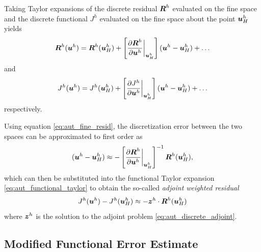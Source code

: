 Taking Taylor expansions of the discrete residual $\boldsymbol{R}^h$ evaluated on the
fine space and the discrete functional $J^h$ evaluated on the fine space
about the point $\boldsymbol{u}^h_H$ yields
%
\begin{gather}
\boldsymbol{R}^h(\boldsymbol{u}^h) = \boldsymbol{R}^h(\boldsymbol{u}^h_H) +
\left[ 
\frac{ \partial \boldsymbol{R}^h }{ \partial \boldsymbol{u}^h} \biggr|_{\boldsymbol{u}^h_H}
\right]
(\boldsymbol{u}^h - \boldsymbol{u}^h_H) + \dots
\label{eq:aut_residual_taylor}
\end{gather}
%
and
%
%
\begin{gather}
J^h(\boldsymbol{u}^h) = J^h(\boldsymbol{u}^h_H) +
\left[
\frac{ \partial J^h } { \partial \boldsymbol{u}^h} \biggr|_{\boldsymbol{u}^h_H}
\right]
(\boldsymbol{u}^h - \boldsymbol{u}^h_H) + \dots
\label{eq:aut_functional_taylor}
\end{gather}
%
respectively.

Using equation \eqref{eq:aut_fine_resid}, the discretization error
between the two spaces can be approximated to first order as
%
\begin{gather}
(\boldsymbol{u}^h - \boldsymbol{u}^h_H) \approx
- \left[
\frac{ \partial \boldsymbol{R}^h } { \partial \boldsymbol{u}^h } \biggr|_{\boldsymbol{u}^h_H}
\right]^{-1}
\boldsymbol{R}^h (\boldsymbol{u}^h_H ),
\label{eq:aut_disc_error_approx}
\end{gather}
%
which can then be substituted into the functional Taylor expansion
\eqref{eq:aut_functional_taylor} to obtain the so-called
\emph{adjoint weighted residual}
%
\begin{gather}
J^h(\boldsymbol{u}^h) - J^h(\boldsymbol{u}^h_H) \approx  - \boldsymbol{z}^h \cdot \boldsymbol{R}^h(\boldsymbol{u}^h_H)
\label{eq:aut_adjoint_weighted_residual}
\end{gather}
%
where $\boldsymbol{z}^h$ is the solution to the adjoint problem
\eqref{eq:aut_discrete_adjoint}.

\subsection{Modified Functional Error Estimate}

